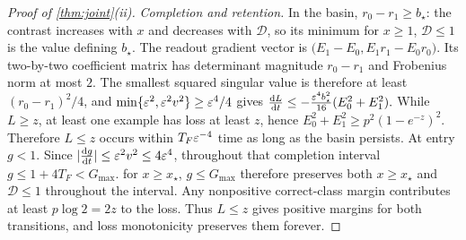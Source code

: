 \begin{proof}[Proof of \cref{thm:joint}(ii)]
\emph{Completion and retention.}
In the basin, $r_0-r_1\ge b_\star$: the contrast increases with $x$ and decreases with $\mathcal D$, so its minimum for $x\ge1$, $\mathcal D\le1$
is the value defining $b_\star$. The readout gradient vector is
$\bigl(E_1-E_0,E_1r_1-E_0r_0\bigr)$.
Its two-by-two coefficient matrix has determinant magnitude $r_0-r_1$ and Frobenius norm at most $2$.
The smallest squared singular value is therefore at least $(r_0-r_1)^2/4$, and
$\min\{\varepsilon^2,\varepsilon^2v^2\}\ge\varepsilon^4/4$ gives
 $\ddt{L}\le-\frac{\initscale^4b_\star^2}{16}(E_0^2+E_1^2).$ 
While $L\ge z$, at least one example has loss at least $z$, hence
$E_0^2+E_1^2\ge p^2(1-e^{-z})^2$. Therefore $L\le z$ occurs within $T_F\varepsilon^{-4}$ time as long as the basin persists.
At entry $g<1$. Since $|\ddt{g}|\le\initscale^2v^2\le4\initscale^4$, throughout that completion interval
$g\le1+4T_F<G_{\max}$.  for $x\ge x_\star$, $g\le G_{\max}$ therefore preserves both $x\ge x_\star$ and $\mathcal D\le1$ throughout the interval.
Any nonpositive correct-class margin contributes at least $p\log2=2z$ to the loss. Thus $L\le z$ gives positive margins for both transitions, and loss monotonicity preserves them forever.
\end{proof}


